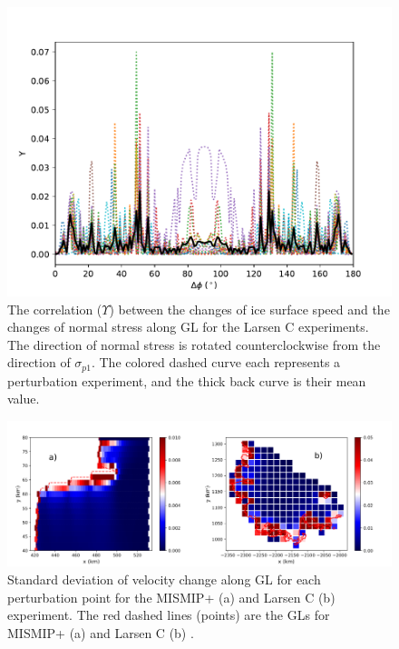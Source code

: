 \documentclass[tc, manuscript]{copernicus}
\begin{document}
\begin{figure}
	\centering
	\includegraphics[width=1\linewidth]{figs/stress_vel_corr_GL_allP_larsenC.pdf}
	\caption{The correlation ($\Upsilon$) between the changes of ice surface speed and the changes of normal stress along GL for the Larsen C experiments. The direction of normal stress is rotated counterclockwise from the direction of $\sigma_{p1}$. The colored dashed curve each represents a perturbation experiment, and the thick back curve is their mean value.}
	\label{stress_vel_corr_GL_allP_larsenC}
\end{figure}

\begin{figure}
	\centering
    \includegraphics[width=1\linewidth]{figs/vel_change_std.pdf}
    \caption{Standard deviation of velocity change along GL for each perturbation point for the MISMIP+ (a) and Larsen C (b) experiment. The red dashed lines (points) are the GLs for MISMIP+ (a) and Larsen C (b) .}
	\label{vel_change_std}
\end{figure}
\end{document}
